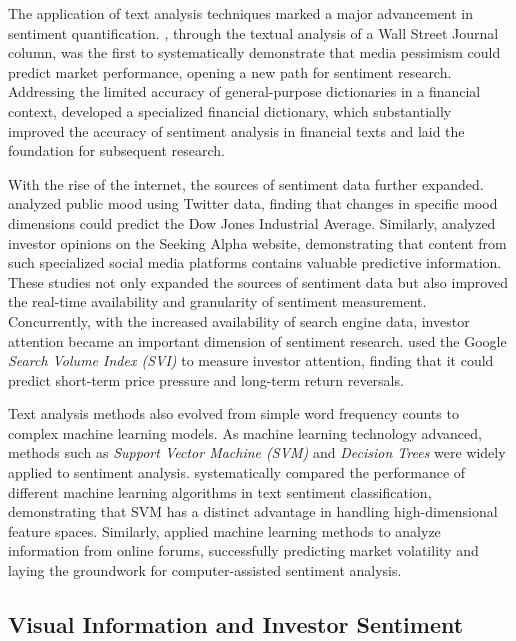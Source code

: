 \documentclass[AER]{AEA}
\begin{document}
The application of text analysis techniques marked a major advancement in sentiment quantification. \citet{tetlock2007giving}, through the textual analysis of a Wall Street Journal column, was the first to systematically demonstrate that media pessimism could predict market performance, opening a new path for sentiment research. Addressing the limited accuracy of general-purpose dictionaries in a financial context, \citet{loughran2011liability} developed a specialized financial dictionary, which substantially improved the accuracy of sentiment analysis in financial texts and laid the foundation for subsequent research.

With the rise of the internet, the sources of sentiment data further expanded. \citet{bollen2011twitter} analyzed public mood using Twitter data, finding that changes in specific mood dimensions could predict the Dow Jones Industrial Average. Similarly, \citet{chen2014wisdom} analyzed investor opinions on the Seeking Alpha website, demonstrating that content from such specialized social media platforms contains valuable predictive information. These studies not only expanded the sources of sentiment data but also improved the real-time availability and granularity of sentiment measurement. Concurrently, with the increased availability of search engine data, investor attention became an important dimension of sentiment research. \citet{da2011search} used the Google \textit{Search Volume Index (SVI)} to measure investor attention, finding that it could predict short-term price pressure and long-term return reversals.

Text analysis methods also evolved from simple word frequency counts to complex machine learning models. As machine learning technology advanced, methods such as \textit{Support Vector Machine (SVM)} and \textit{Decision Trees} were widely applied to sentiment analysis. \citet{pang2008opinion} systematically compared the performance of different machine learning algorithms in text sentiment classification, demonstrating that SVM has a distinct advantage in handling high-dimensional feature spaces. Similarly, \citet{antweiler2004all} applied machine learning methods to analyze information from online forums, successfully predicting market volatility and laying the groundwork for computer-assisted sentiment analysis.

\subsection{Visual Information and Investor Sentiment}
\end{document}

